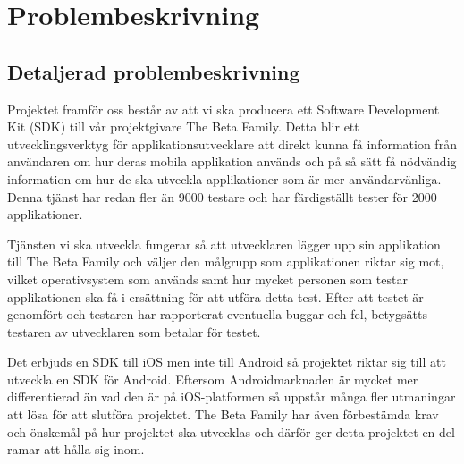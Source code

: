 \section{Problembeskrivning}
\subsection{Detaljerad problembeskrivning}
Projektet framför oss består av att vi ska producera ett Software Development Kit (SDK) till vår projektgivare The Beta Family. Detta blir ett utvecklingsverktyg för applikationsutvecklare att direkt kunna få information från användaren om hur deras mobila applikation används och på så sätt få nödvändig information om hur de ska utveckla applikationer som är mer användarvänliga. Denna tjänst har redan fler än 9000 testare och har färdigställt tester för 2000 applikationer.


Tjänsten vi ska utveckla fungerar så att utvecklaren lägger upp sin applikation till The Beta Family och väljer den målgrupp som applikationen riktar sig mot, vilket operativsystem som används samt hur mycket personen som testar applikationen ska få i ersättning för att utföra detta test. Efter att testet är genomfört och testaren har rapporterat eventuella buggar och fel, betygsätts testaren av utvecklaren som betalar för testet.


Det erbjuds en SDK till iOS men inte till Android så projektet riktar sig till att utveckla en SDK för Android. Eftersom Androidmarknaden är mycket mer differentierad än vad den är på iOS-platformen så uppstår många fler utmaningar att lösa för att slutföra projektet. The Beta Family har även förbestämda krav och önskemål på hur projektet ska utvecklas och därför ger detta projektet en del ramar att hålla sig inom.


